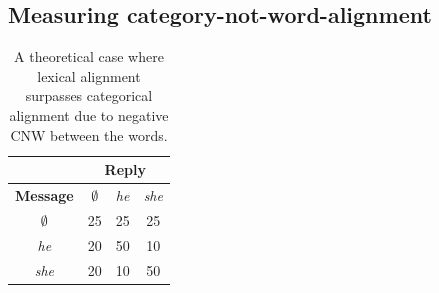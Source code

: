 \documentclass[11pt]{article}
\begin{document}




\subsection{Measuring category-not-word-alignment}

\begin{table}[t]
\begin{center}
\begin{tabular}{|c||c|c|c|}
\hline
& \multicolumn{3}{|c|}{\bf Reply} \\
\hline
\bf Message & $\emptyset$ & \textit{he} & \textit{she} \\ \hline
$\emptyset$ & 25 & 25 & 25\\
\textit{he} & 20 & 50 & 10 \\
\textit{she} & 20 & 10 & 50 \\
\hline
\end{tabular}
\end{center}
\caption{\label{table:cnw-example1} A theoretical case where lexical alignment surpasses categorical alignment due to negative CNW between the words.}
\end{table}
\end{document}
